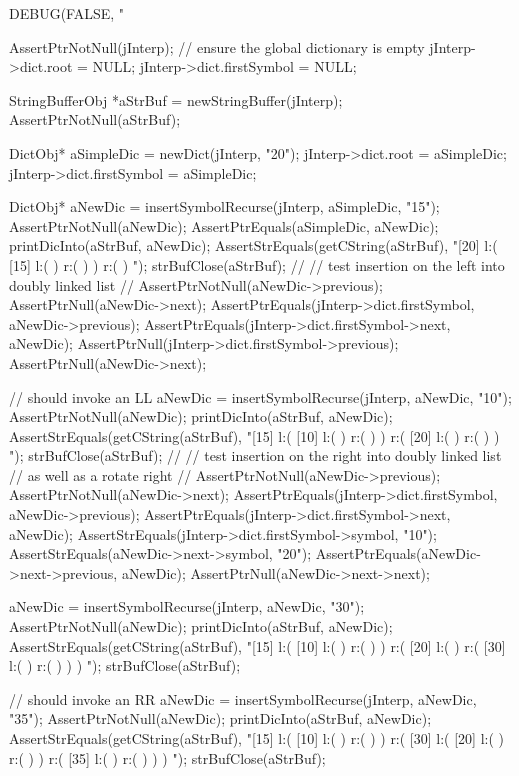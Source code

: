 \startCTest
  DEBUG(FALSE, "\n%

  AssertPtrNotNull(jInterp);
  // ensure the global dictionary is empty
  jInterp->dict.root        = NULL;
  jInterp->dict.firstSymbol = NULL;

  StringBufferObj *aStrBuf = newStringBuffer(jInterp);
  AssertPtrNotNull(aStrBuf);
  
  DictObj* aSimpleDic = newDict(jInterp, "20");
  jInterp->dict.root        = aSimpleDic;
  jInterp->dict.firstSymbol = aSimpleDic;

  DictObj* aNewDic = insertSymbolRecurse(jInterp, aSimpleDic, "15");
  AssertPtrNotNull(aNewDic);
  AssertPtrEquals(aSimpleDic, aNewDic);
  printDicInto(aStrBuf, aNewDic);
  AssertStrEquals(getCString(aStrBuf),
  "[20] l:( [15] l:(  ) r:(  )  ) r:(  ) ");
  strBufClose(aStrBuf);
  //
  // test insertion on the left into doubly linked list
  //
  AssertPtrNotNull(aNewDic->previous);
  AssertPtrNull(aNewDic->next);
  AssertPtrEquals(jInterp->dict.firstSymbol, aNewDic->previous);
  AssertPtrEquals(jInterp->dict.firstSymbol->next, aNewDic);
  AssertPtrNull(jInterp->dict.firstSymbol->previous);
  AssertPtrNull(aNewDic->next);

  // should invoke an LL
  aNewDic = insertSymbolRecurse(jInterp, aNewDic, "10");
  AssertPtrNotNull(aNewDic);
  printDicInto(aStrBuf, aNewDic);
  AssertStrEquals(getCString(aStrBuf),
  "[15] l:( [10] l:(  ) r:(  )  ) r:( [20] l:(  ) r:(  )  ) ");
  strBufClose(aStrBuf);
  //
  // test insertion on the right into doubly linked list
  // as well as a rotate right
  //
  AssertPtrNotNull(aNewDic->previous);
  AssertPtrNotNull(aNewDic->next);
  AssertPtrEquals(jInterp->dict.firstSymbol, aNewDic->previous);
  AssertPtrEquals(jInterp->dict.firstSymbol->next, aNewDic);
  AssertStrEquals(jInterp->dict.firstSymbol->symbol, "10");
  AssertStrEquals(aNewDic->next->symbol, "20");
  AssertPtrEquals(aNewDic->next->previous, aNewDic);
  AssertPtrNull(aNewDic->next->next);

  aNewDic = insertSymbolRecurse(jInterp, aNewDic, "30");
  AssertPtrNotNull(aNewDic);
  printDicInto(aStrBuf, aNewDic);
  AssertStrEquals(getCString(aStrBuf),
  "[15] l:( [10] l:(  ) r:(  )  ) r:( [20] l:(  ) r:( [30] l:(  ) r:(  )  )  ) ");
  strBufClose(aStrBuf);
  
  // should invoke an RR
  aNewDic = insertSymbolRecurse(jInterp, aNewDic, "35");
  AssertPtrNotNull(aNewDic);
  printDicInto(aStrBuf, aNewDic);
  AssertStrEquals(getCString(aStrBuf),
  "[15] l:( [10] l:(  ) r:(  )  ) r:( [30] l:( [20] l:(  ) r:(  )  ) r:( [35] l:(  ) r:(  )  )  ) ");
  strBufClose(aStrBuf);

